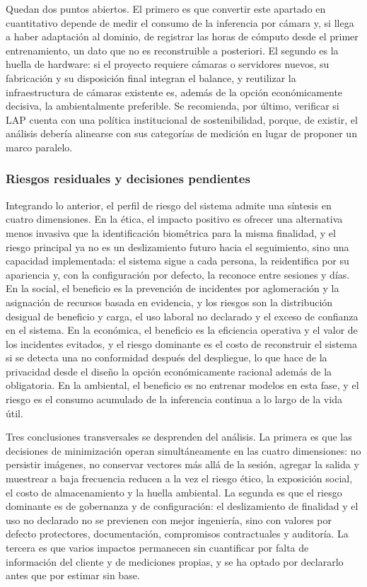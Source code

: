 Quedan dos puntos abiertos. El primero es que convertir este apartado en
cuantitativo depende de medir el consumo de la inferencia por cámara y, si llega
a haber adaptación al dominio, de registrar las horas de cómputo desde el primer
entrenamiento, un dato que no es reconstruible a posteriori. El segundo es la
huella de hardware: si el proyecto requiere cámaras o servidores nuevos, su
fabricación y su disposición final integran el balance, y reutilizar la
infraestructura de cámaras existente es, además de la opción económicamente
decisiva, la ambientalmente preferible. Se recomienda, por último, verificar si
LAP cuenta con una política institucional de sostenibilidad, porque, de existir,
el análisis debería alinearse con sus categorías de medición en lugar de
proponer un marco paralelo.

\subsubsection{Riesgos residuales y decisiones pendientes}

Integrando lo anterior, el perfil de riesgo del sistema admite una síntesis en
cuatro dimensiones. En la ética, el impacto positivo es ofrecer una alternativa
menos invasiva que la identificación biométrica para la misma finalidad, y el
riesgo principal ya no es un deslizamiento futuro hacia el seguimiento, sino
una capacidad implementada: el sistema sigue a cada persona, la reidentifica
por su apariencia y, con la configuración por defecto, la reconoce entre
sesiones y días. En la social, el beneficio es la prevención de incidentes por
aglomeración y la asignación de recursos basada en evidencia, y los riesgos son
la distribución desigual de beneficio y carga, el uso laboral no declarado y el
exceso de confianza en el sistema. En la económica, el beneficio es la
eficiencia operativa y el valor de los incidentes evitados, y el riesgo
dominante es el costo de reconstruir el sistema si se detecta una no
conformidad después del despliegue, lo que hace de la privacidad desde el
diseño la opción económicamente racional además de la obligatoria. En la
ambiental, el beneficio es no entrenar modelos en esta fase, y el riesgo es el
consumo acumulado de la inferencia continua a lo largo de la vida útil.

Tres conclusiones transversales se desprenden del análisis. La primera es que
las decisiones de minimización operan simultáneamente en las cuatro
dimensiones: no persistir imágenes, no conservar vectores más allá de la
sesión, agregar la salida y muestrear a baja frecuencia reducen a la vez el
riesgo ético, la exposición social, el costo de almacenamiento y la huella
ambiental. La segunda es que el riesgo dominante es de gobernanza y de
configuración: el deslizamiento de finalidad y el uso no declarado no se
previenen con mejor ingeniería, sino con valores por defecto protectores,
documentación, compromisos contractuales y auditoría. La tercera es que varios
impactos permanecen sin cuantificar por falta de información del cliente y de
mediciones propias, y se ha optado por declararlo antes que por estimar sin
base.

